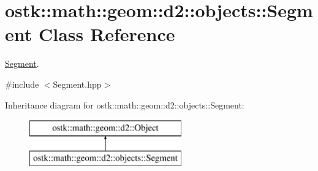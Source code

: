 \hypertarget{classostk_1_1math_1_1geom_1_1d2_1_1objects_1_1_segment}{}\section{ostk\+:\+:math\+:\+:geom\+:\+:d2\+:\+:objects\+:\+:Segment Class Reference}
\label{classostk_1_1math_1_1geom_1_1d2_1_1objects_1_1_segment}


\hyperlink{classostk_1_1math_1_1geom_1_1d2_1_1objects_1_1_segment}{Segment}.  




{\ttfamily \#include $<$Segment.\+hpp$>$}

Inheritance diagram for ostk\+:\+:math\+:\+:geom\+:\+:d2\+:\+:objects\+:\+:Segment\+:\begin{figure}[H]
\begin{center}
\leavevmode
\includegraphics[height=2.000000cm]{classostk_1_1math_1_1geom_1_1d2_1_1objects_1_1_segment}
\end{center}
\end{figure}
